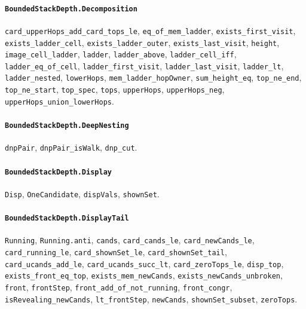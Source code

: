\paragraph{\texttt{BoundedStackDepth.Decomposition}}
{\small\raggedright \texttt{card\_upperHops\_add\_card\_tops\_le}, \texttt{eq\_of\_mem\_ladder}, \texttt{exists\_first\_visit}, \texttt{exists\_ladder\_cell}, \texttt{exists\_ladder\_outer}, \texttt{exists\_last\_visit}, \texttt{height}, \texttt{image\_cell\_ladder}, \texttt{ladder}, \texttt{ladder\_above}, \texttt{ladder\_cell\_iff}, \texttt{ladder\_eq\_of\_cell}, \texttt{ladder\_first\_visit}, \texttt{ladder\_last\_visit}, \texttt{ladder\_lt}, \texttt{ladder\_nested}, \texttt{lowerHops}, \texttt{mem\_ladder\_hopOwner}, \texttt{sum\_height\_eq}, \texttt{top\_ne\_end}, \texttt{top\_ne\_start}, \texttt{top\_spec}, \texttt{tops}, \texttt{upperHops}, \texttt{upperHops\_neg}, \texttt{upperHops\_union\_lowerHops}.\par}

\paragraph{\texttt{BoundedStackDepth.DeepNesting}}
{\small\raggedright \texttt{dnpPair}, \texttt{dnpPair\_isWalk}, \texttt{dnp\_cut}.\par}

\paragraph{\texttt{BoundedStackDepth.Display}}
{\small\raggedright \texttt{Disp}, \texttt{OneCandidate}, \texttt{dispVals}, \texttt{shownSet}.\par}

\paragraph{\texttt{BoundedStackDepth.DisplayTail}}
{\small\raggedright \texttt{Running}, \texttt{Running.anti}, \texttt{cands}, \texttt{card\_cands\_le}, \texttt{card\_newCands\_le}, \texttt{card\_running\_le}, \texttt{card\_shownSet\_le}, \texttt{card\_shownSet\_tail}, \texttt{card\_ucands\_add\_le}, \texttt{card\_ucands\_succ\_lt}, \texttt{card\_zeroTops\_le}, \texttt{disp\_top}, \texttt{exists\_front\_eq\_top}, \texttt{exists\_mem\_newCands}, \texttt{exists\_newCands\_unbroken}, \texttt{front}, \texttt{frontStep}, \texttt{front\_add\_of\_not\_running}, \texttt{front\_congr}, \texttt{isRevealing\_newCands}, \texttt{lt\_frontStep}, \texttt{newCands}, \texttt{shownSet\_subset}, \texttt{zeroTops}.\par}

